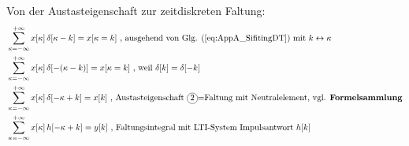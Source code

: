 \begin{mdframed}
Von der Austasteigenschaft  zur zeitdiskreten Faltung:
\begin{align}
&\sum\limits_{\kappa=-\infty}^{+\infty} x[\kappa] \, \delta[\kappa-k] = x[\kappa=k]\text{ , ausgehend von \eq{eq:AppA_SifitingDT} mit } k \leftrightarrow \kappa\nonumber\\
&\sum\limits_{\kappa=-\infty}^{+\infty} x[\kappa] \, \delta[-(\kappa-k)] = x[\kappa=k]\text{ , weil }\delta[k]=\delta[-k]\nonumber\\
&\sum\limits_{\kappa=-\infty}^{+\infty} x[\kappa] \, \delta[-\kappa+k] = x[k] \text{ , Austasteigenschaft \circled{2}=Faltung mit Neutralelement, vgl. \textbf{Formelsammlung}}\nonumber\\
&\sum\limits_{\kappa=-\infty}^{+\infty} x[\kappa] \, h[-\kappa+k] = y[k] \text{ , Faltungsintegral mit LTI-System Impulsantwort } h[k]
\end{align}
\end{mdframed}
